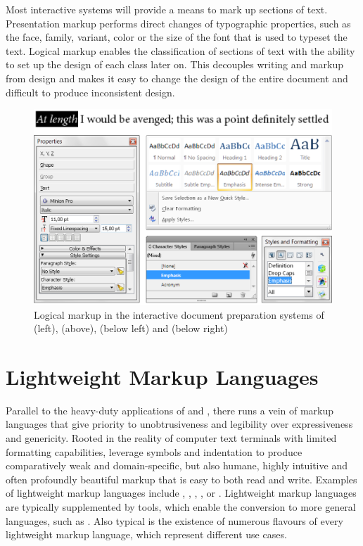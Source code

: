 \documentclass{book}
\begin{document}
Most interactive systems will provide a means to mark up sections of text.
Presentation markup performs direct changes of typographic properties, such as
the face, family, variant, color or the size of the font that is used to typeset
the text. Logical markup enables the classification of sections of text with the
ability to set up the design of each class later on. This decouples writing and
markup from design and makes it easy to change the design of the entire document
and difficult to produce inconsistent design.

\begin{figure}
  \includegraphics[width=\textwidth]{examples/02/interactive-editors.png}
  \caption{Logical markup in the interactive document preparation systems of
     (left),  (above), 
    (below left) and  (below right)}
\end{figure}

\section{Lightweight Markup Languages}
Parallel to the heavy-duty applications of  and ,
there runs a vein of markup languages that give priority to unobtrusiveness and
legibility over expressiveness and genericity.  Rooted in the reality of
computer text terminals with limited formatting capabilities,   leverage symbols and
indentation to produce comparatively weak and domain-specific, but also humane,
highly intuitive and often profoundly beautiful markup that is easy to both read
and write. Examples of lightweight markup languages include ,
, , ,  or .
Lightweight markup languages are typically supplemented by tools, which enable
the conversion to more general languages, such as .  Also typical
is the existence of numerous flavours of every lightweight markup language,
which represent different use cases.
\end{document}
